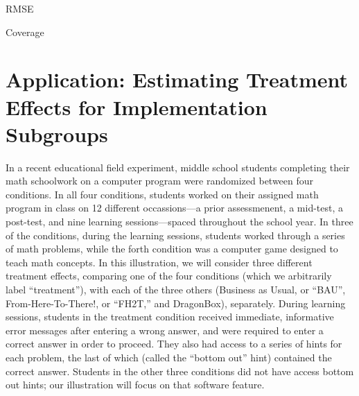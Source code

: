 \documentclass[11pt]{article} %
\begin{document}
  \begin{table}
    \centering
  
  \caption{RMSE }
\end{table}

\begin{table}
  
  \caption{Coverage}
  \label{tab:coverage}
\end{table}


\section{Application: Estimating Treatment Effects for Implementation Subgroups}

In a recent educational field experiment, middle school students completing their math schoolwork on a computer program were randomized between four conditions. In all four conditions, students worked on their assigned math program in class on 12 different occassions---a prior assessmenent, a mid-test, a post-test, and nine learning sessions---spaced throughout the school year.  In three of the conditions, during the learning sessions, students worked through a series of math problems, while the forth condition was a computer game designed to teach math concepts. In this illustration, we will consider three different treatment effects, comparing one of the four conditions (which we arbitrarily label ``treatment''), with each of the three others (Business as Usual, or ``BAU'', From-Here-To-There!, or ``FH2T,'' and DragonBox), separately. During learning sessions, students in the treatment condition received immediate, informative error messages after entering a wrong answer, and were required to enter a correct answer in order to proceed. They also had access to a series of hints for each problem, the last of which (called the ``bottom out'' hint) contained the correct answer. Students in the other three conditions did not have access bottom out hints; our illustration will focus on that software feature.
\end{document}
